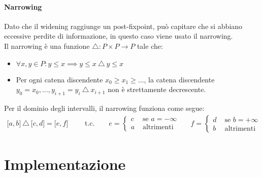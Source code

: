 \documentclass[a4paper, 10pt]{report}
\begin{document}
\subsubsection*{Narrowing}
Dato che il widening raggiunge un post-fixpoint, può capitare che si abbiano eccessive perdite di informazione, in questo caso viene usato il narrowing.
\\
	Il narrowing è una funzione $ \triangle : P \times P \to P$ tale che:
	\begin{itemize}
		\item $\forall x, y \in P: y \leq x \implies y \leq x\ \triangle\ y \leq x$
		\item Per ogni catena discendente $x_0 \geq x_1 \geq ...$, la catena discendente $y_0=x_0, ..., y_{i+1} = y_i\ \triangle\ x_{i+1}$ non è strettamente decrescente.
	\end{itemize}

\noindent
Per il dominio degli intervalli, il narrowing funziona come segue:
\begin{align*}
\lbrack a, b \rbrack\ \triangle\ \lbrack c, d \rbrack = \lbrack e, f \rbrack \qquad \text{ t.c. ~~~~~}
e = 
\begin{cases}
c &\text{ se } a = -\infty \\
a &\text{ altrimenti}
\end{cases}
~~~~~~~f = 
\begin{cases}
d &\text{ se } b = +\infty\\
b &\text{ altrimenti }
\end{cases}
\end{align*}



\chapter*{Implementazione}
\end{document}
